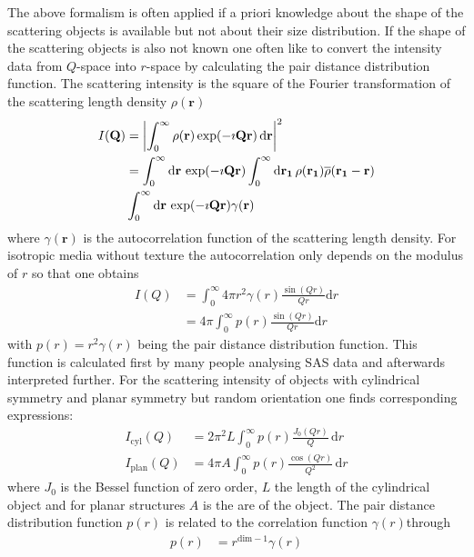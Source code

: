 The above formalism is often applied if a priori knowledge about the shape of the scattering objects is available but not about their size distribution. If the shape of the scattering objects is also not known one often like to convert the intensity data from $Q$-space into $r$-space by calculating the pair distance distribution function. The scattering intensity is the square of the Fourier transformation of the scattering length density $\rho(\mathbf{r})$
\begin{align}
I(\mathbf{Q}) &= \abs{\int_0^\infty \rho(\mathbf{r}) \exp(-\imath \mathbf{Q r}) \, \mathrm{d}\mathbf{r}}^2  \\
              &= \int_0^\infty \mathrm{d}\mathbf{r} \,  \exp(-\imath \mathbf{Q r}) \int_0^\infty \mathrm{d}\mathbf{r_1}\, \rho(\mathbf{r_1}) \overline{\rho}(\mathbf{r_1}-\mathbf{r}) \\
              & \int_0^\infty \mathrm{d}\mathbf{r} \,\exp(-\imath \mathbf{Q r}) \gamma(\mathbf{r})
\end{align}
where $\gamma(\mathbf{r})$ is the autocorrelation function of the scattering length density. For isotropic media without texture the autocorrelation only depends on the modulus of $r$ so that one obtains
\begin{align}
I(Q) &= \int_0^\infty 4\pi r^2 \gamma(r) \frac{\sin(Qr)}{Qr} \mathrm{d}r\\
     &= 4\pi \int_0^\infty p(r) \frac{\sin(Qr)}{Qr} \mathrm{d}r \label{eq:Isp}
\end{align}
with $p(r)= r^2 \gamma(r)$ being the pair distance distribution function. This function is calculated first by many people analysing SAS data and afterwards interpreted further. For the scattering intensity of objects with cylindrical symmetry and planar symmetry but random orientation one finds corresponding expressions:
\begin{align}
I_\mathrm{cyl}(Q) &= 2\pi^2 L \int_0^\infty p(r) \frac{J_0(Qr)}{Q} \, \mathrm{d}r \label{eq:Icyl} \\
I_\mathrm{plan}(Q) &= 4\pi A \int_0^\infty p(r) \frac{\cos(Qr)}{Q^2} \, \mathrm{d}r \label{eq:Ipl}
\end{align}
where $J_0$ is the Bessel function of zero order, $L$ the length of the cylindrical object and for planar structures $A$ is the are of the object. The pair distance distribution function $p(r)$ is related to the correlation function $\gamma(r)$through
\begin{align}
p(r) &= r^{\mathrm{dim}-1} \gamma(r)
\end{align}
